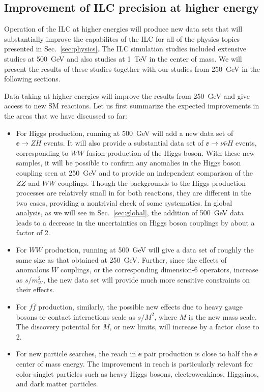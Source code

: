 \subsection{Improvement of ILC precision at higher energy}
\label{subsec:highE:physics}

Operation of the ILC at higher energies will produce new data sets
that will substantially improve the capabilites of the ILC for all of
the physics topics presented in Sec.~\ref{sec:physics}.    The ILC
simulation studies included extensive studies at 500~GeV 
 and also studies at 1~TeV in the center of mass.   We will present
 the results of these studies together with our studies from 250~GeV in
 the following sections.

Data-taking at higher energies will improve the results from 250~GeV
and give access to new SM reactions.   Let us first summarize the
expected
improvements in the areas that we have discussed so far:
\begin{itemize}
\item  For Higgs production, running   at 500~GeV will add a new data set
 of  $\ee\to ZH$ events.  It will also provide   a substantial data set of $\ee\to
 \nu\bar\nu H$ events, corresponding to $WW$ fusion production of the
 Higgs boson.   With these new samples, it will be possible to confirm
 any anomalies in the Higgs boson coupling seen at 250~GeV and to
 provide an independent comparison of the $ZZ$ and $WW$ couplings.
Though the backgrounds to the Higgs production processes are
relatively small in for both reactions, they are different in the two
cases, providing a nontrivial check of some systematics. In global
analysis, as we will see in Sec.~\ref{sec:global}, the addition of
500~GeV data leads to a decrease in the uncertainties on Higgs boson
couplings by about a factor of 2. 

\item For $WW$ production, running at 500~GeV will give a data set of
  roughly the same size as that obtained at 250~GeV.  Further, since
  the effects of anomalous $W$ couplings, or the corresponding
  dimension-6 operators, increase as $s/m_W^2$, the new data set will
  provide much more sensitive constraints on their effects.

\item For $f\bar f$ production, similarly, the possible new effects   
  due to heavy gauge bosons or contact interactions scale as $s/M^2$,
  where $M$ is the new mass scale.   The discovery potential for $M$,
  or new limits, will increase by a factor close to 2. 

\item For new particle searches, the reach in $\ee$ pair production is
  close to half the $\ee$  center of mass energy. The  improvement in
  reach is particularly relevant for color-singlet particles such as
  heavy Higgs bosons, electroweakinos, Higgsinos, and dark matter
  particles.  
\end{itemize}

